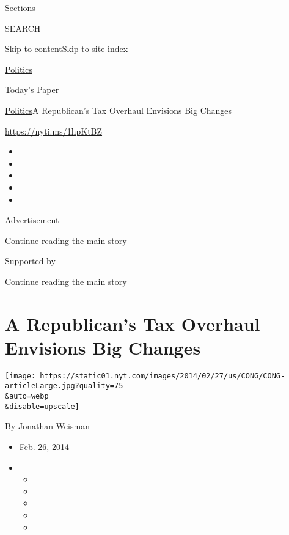 Sections

SEARCH

\protect\hyperlink{site-content}{Skip to
content}\protect\hyperlink{site-index}{Skip to site index}

\href{https://www.nytimes.com/section/politics}{Politics}

\href{https://myaccount.nytimes.com/auth/login?response_type=cookie\&client_id=vi}{}

\href{https://www.nytimes.com/section/todayspaper}{Today's Paper}

\href{/section/politics}{Politics}\textbar{}A Republican's Tax Overhaul
Envisions Big Changes

\url{https://nyti.ms/1hpKtBZ}

\begin{itemize}
\item
\item
\item
\item
\item
\end{itemize}

Advertisement

\protect\hyperlink{after-top}{Continue reading the main story}

Supported by

\protect\hyperlink{after-sponsor}{Continue reading the main story}

\hypertarget{a-republicans-tax-overhaul-envisions-big-changes}{%
\section{A Republican's Tax Overhaul Envisions Big
Changes}\label{a-republicans-tax-overhaul-envisions-big-changes}}

\texttt{[image: https://static01.nyt.com/images/2014/02/27/us/CONG/CONG-articleLarge.jpg?quality=75\\\&auto=webp\\\&disable=upscale]}

By \href{http://www.nytimes.com/by/jonathan-weisman}{Jonathan Weisman}

\begin{itemize}
\item
  Feb. 26, 2014
\item
  \begin{itemize}
  \item
  \item
  \item
  \item
  \item
  \end{itemize}
\end{itemize}

